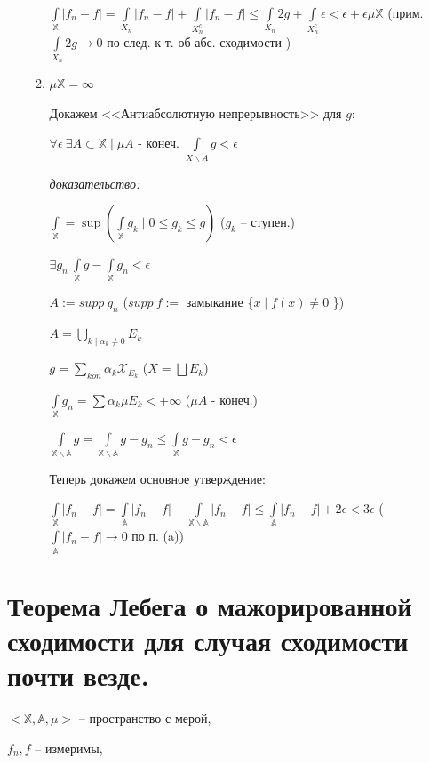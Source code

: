 \documentclass[paper=a4, fontsize=17pt]{article}
\begin{document}
\begin{flushleft}
\begin{enumerate}
\begin{enumerate}
		$ \int\limits_{\mathbb{X}} |f_n - f| =
		\int\limits_{X_n} |f_n - f| + \int\limits_{X_n^c} |f_n - f| \leq
		\int\limits_{X_n} 2g + \int\limits_{X_n^c} \epsilon < \epsilon + \epsilon \mu \mathbb{X} $ (прим. $ \int\limits_{X_n} 2g \rightarrow 0 $ по след. к т. об абс. сходимости )

		\item $ \mu \mathbb{X} = \infty $

		Докажем <<Антиабсолютную непрерывность>> для $ g $:

		$ \forall \epsilon ~ \exists A \subset \mathbb{X} \mid \mu A$ - конеч.
		$ \int\limits_{X\backslash A} g < \epsilon $

		\textit{доказательство:}

		$ \int\limits_{\mathbb{X}} = \sup ( \int\limits_{\mathbb{X}} g_k \mid 0 \leq g_k \leq g) $ ($ g_k $ -- ступен.)

		$ \exists g_n ~ \int\limits_{\mathbb{X}} g - \int\limits_{\mathbb{X}} g_n < \epsilon $

		$ A:= supp\ g_n $ ($ supp\ f := $ замыкание \{$ x \mid f(x) \neq 0$ \})

		$ A =  \bigcup\limits_{k \mid \alpha_k \neq 0} E_k $

		$ g = \sum\limits_{kon} \alpha_k \mathcal{X}_{E_k} $ ($ X = \bigsqcup E_k $)

		$ \int\limits_{\mathbb{X}} g_n  = \sum \alpha_k \mu E_k  < +\infty $ ($ \mu A $ - конеч.)

		$ \int\limits_{\mathbb{X\backslash A}} g =
		\int\limits_{\mathbb{X\backslash A}} g - g_n \leq
		\int\limits_{\mathbb{X}} g - g_n < \epsilon $

		Теперь докажем основное утверждение:

		 $ \int\limits_{\mathbb{X}} |f_n - f| =
		 \int\limits_{\mathbb{A}} |f_n - f| + \int\limits_{\mathbb{X\backslash A}} |f_n - f| \leq
		 \int\limits_{\mathbb{A}} |f_n - f| + 2\epsilon < 3 \epsilon $
		 ($  \int\limits_{\mathbb{A}} |f_n - f| \rightarrow 0$  по п. (a))
	\end{enumerate}
\end{enumerate}
\end{flushleft}
\section{Теорема Лебега о мажорированной сходимости для случая сходимости почти везде.}
$<\mathds{X}, \mathds{A}, \mu>$ -- пространство с мерой,

$f_n, f$ -- измеримы,
\end{document}
